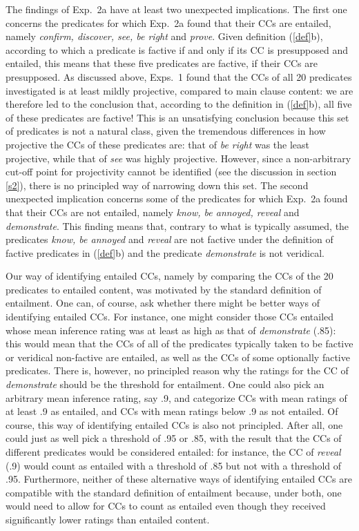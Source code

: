 \documentclass[11pt,fleqn]{article}
\newcommand{\6}{\mbox{$[\hspace*{-.6mm}[$}}
\newcommand{\9}{\mbox{$]\hspace*{-.6mm}]$}}
\begin{document}
The findings of Exp.~2a have at least two unexpected implications. The first one concerns the predicates for which Exp.~2a found that their CCs are entailed, namely {\em confirm, discover, see, be right} and {\em prove}. Given definition (\ref{def}b), according to which a predicate is factive if and only if its CC is presupposed and entailed, this means that these five predicates are factive, if their CCs are presupposed. As discussed above, Exps.~1 found that the CCs of all 20 predicates investigated is at least mildly projective, compared to main clause content: we are therefore led to the conclusion that, according to the definition in (\ref{def}b), all five of these predicates are factive! This is an unsatisfying conclusion because this set of predicates is not a natural class, given the tremendous differences in how projective the CCs of these predicates are: that of {\em be right} was the least projective, while that of {\em see} was highly projective. However, since a non-arbitrary cut-off point for projectivity cannot be identified (see the discussion in section \ref{s2}), there is no principled way of narrowing down this set. The second unexpected implication concerns some of the predicates for which Exp.~2a found that their CCs are not entailed, namely {\em know, be annoyed, reveal} and {\em demonstrate}. This finding means that, contrary to what is typically assumed, the predicates {\em know, be annoyed} and {\em reveal} are not factive under the definition of factive predicates in (\ref{def}b) and the predicate {\em demonstrate} is not veridical.

Our way of identifying entailed CCs, namely by comparing the CCs of the 20 predicates to entailed content, was motivated by the standard definition of entailment. One can, of course, ask whether there might be better ways of identifying entailed CCs. For instance, one might consider those CCs entailed whose mean inference rating was at least as high as that of {\em demonstrate} (.85): this would mean that the CCs of all of the predicates typically taken to be factive or veridical non-factive are entailed, as well as the CCs of some optionally factive predicates. There is, however, no principled reason why the ratings for the CC of {\em demonstrate} should be the threshold for entailment. One could also pick an arbitrary mean inference rating, say .9, and categorize CCs with mean ratings of at least .9 as entailed, and CCs with mean ratings below .9 as not entailed. Of course, this way of identifying entailed CCs is also not principled. After all, one could just as well pick a threshold of .95 or .85, with the result that the CCs of different predicates would be considered entailed: for instance, the CC of {\em reveal} (.9) would count as entailed with a threshold of .85 but not with a threshold of .95. Furthermore, neither of these alternative ways of identifying entailed CCs are compatible with the standard definition of entailment because, under both, one would need to allow for CCs to count as entailed even though they received significantly lower ratings than entailed content.
\end{document}
